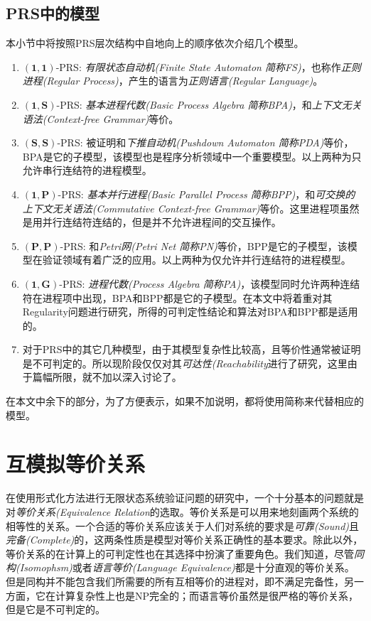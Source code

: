 \subsection{PRS中的模型}
\label{subsec:models}

本小节中将按照PRS层次结构中自地向上的顺序依次介绍几个模型。
\begin{enumerate}
	\item $(\mathbf{1},\mathbf{1})$-PRS: \emph{有限状态自动机(Finite State Automaton 简称FS)}，也称作\emph{正则进程(Regular Process)}，产生的语言为\emph{正则语言(Regular Language)}。
	\item $(\mathbf{1},\mathbf{S})$-PRS: \emph{基本进程代数(Basic Process Algebra 简称BPA)}，和\emph{上下文无关语法(Context-free Grammar)}等价。
	\item $(\mathbf{S},\mathbf{S})$-PRS: 被证明和\emph{下推自动机(Pushdown Automaton 简称PDA)}等价，BPA是它的子模型，该模型也是程序分析领域中一个重要模型。以上两种为只允许串行连结符的进程模型。
	\item $(\mathbf{1},\mathbf{P})$-PRS: \emph{基本并行进程(Basic Parallel Process 简称BPP)}，和\emph{可交换的上下文无关语法(Commutative Context-free Grammar)}等价。这里进程项虽然是用并行连结符连结的，但是并不允许进程间的交互操作。
	\item $(\mathbf{P},\mathbf{P})$-PRS: 和\emph{Petri网(Petri Net 简称PN)}等价，BPP是它的子模型，该模型在验证领域有着广泛的应用。以上两种为仅允许并行连结符的进程模型。
	\item $(\mathbf{1},\mathbf{G})$-PRS: \emph{进程代数(Process Algebra 简称PA)}，该模型同时允许两种连结符在进程项中出现，BPA和BPP都是它的子模型。在本文中将着重对其Regularity问题进行研究，所得的可判定性结论和算法对BPA和BPP都是适用的。
	\item 对于PRS中的其它几种模型，由于其模型复杂性比较高，且等价性通常被证明是不可判定的。所以现阶段仅仅对其\emph{可达性(Reachability}进行了研究，这里由于篇幅所限，就不加以深入讨论了。
\end{enumerate}
在本文中余下的部分，为了方便表示，如果不加说明，都将使用简称来代替相应的模型。

\section{互模拟等价关系}
\label{sec:bis}

在使用形式化方法进行无限状态系统验证问题的研究中，一个十分基本的问题就是对\emph{等价关系(Equivalence Relation}的选取。等价关系是可以用来地刻画两个系统的相等性的关系。一个合适的等价关系应该关于人们对系统的要求是\emph{可靠(Sound)}且\emph{完备(Complete)}的，这两条性质是模型对等价关系正确性的基本要求。除此以外，等价关系的在计算上的可判定性也在其选择中扮演了重要角色。我们知道，尽管\emph{同构(Isomophsm)}或者\emph{语言等价(Language Equivalence)}都是十分直观的等价关系。但是同构并不能包含我们所需要的所有互相等价的进程对，即不满足完备性，另一方面，它在计算复杂性上也是NP完全的；而语言等价虽然是很严格的等价关系，但是它是不可判定的\cite{Hopcroft1979}。

